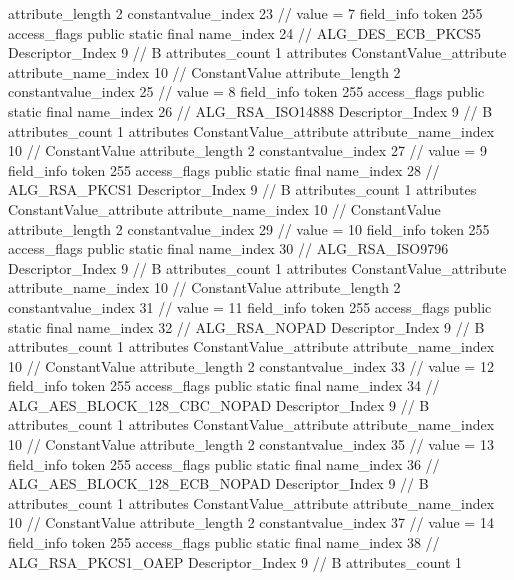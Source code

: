 {{{{{{{					attribute_length	2
					constantvalue_index	23		// value = 7
				}
				}
			}
			field_info {
				token	255
				access_flags	public static final
				name_index	24		// ALG_DES_ECB_PKCS5
				Descriptor_Index	9		// B
				attributes_count	1
				attributes {
				ConstantValue_attribute {
					attribute_name_index	10		// ConstantValue
					attribute_length	2
					constantvalue_index	25		// value = 8
				}
				}
			}
			field_info {
				token	255
				access_flags	public static final
				name_index	26		// ALG_RSA_ISO14888
				Descriptor_Index	9		// B
				attributes_count	1
				attributes {
				ConstantValue_attribute {
					attribute_name_index	10		// ConstantValue
					attribute_length	2
					constantvalue_index	27		// value = 9
				}
				}
			}
			field_info {
				token	255
				access_flags	public static final
				name_index	28		// ALG_RSA_PKCS1
				Descriptor_Index	9		// B
				attributes_count	1
				attributes {
				ConstantValue_attribute {
					attribute_name_index	10		// ConstantValue
					attribute_length	2
					constantvalue_index	29		// value = 10
				}
				}
			}
			field_info {
				token	255
				access_flags	public static final
				name_index	30		// ALG_RSA_ISO9796
				Descriptor_Index	9		// B
				attributes_count	1
				attributes {
				ConstantValue_attribute {
					attribute_name_index	10		// ConstantValue
					attribute_length	2
					constantvalue_index	31		// value = 11
				}
				}
			}
			field_info {
				token	255
				access_flags	public static final
				name_index	32		// ALG_RSA_NOPAD
				Descriptor_Index	9		// B
				attributes_count	1
				attributes {
				ConstantValue_attribute {
					attribute_name_index	10		// ConstantValue
					attribute_length	2
					constantvalue_index	33		// value = 12
				}
				}
			}
			field_info {
				token	255
				access_flags	public static final
				name_index	34		// ALG_AES_BLOCK_128_CBC_NOPAD
				Descriptor_Index	9		// B
				attributes_count	1
				attributes {
				ConstantValue_attribute {
					attribute_name_index	10		// ConstantValue
					attribute_length	2
					constantvalue_index	35		// value = 13
				}
				}
			}
			field_info {
				token	255
				access_flags	public static final
				name_index	36		// ALG_AES_BLOCK_128_ECB_NOPAD
				Descriptor_Index	9		// B
				attributes_count	1
				attributes {
				ConstantValue_attribute {
					attribute_name_index	10		// ConstantValue
					attribute_length	2
					constantvalue_index	37		// value = 14
				}
				}
			}
			field_info {
				token	255
				access_flags	public static final
				name_index	38		// ALG_RSA_PKCS1_OAEP
				Descriptor_Index	9		// B
				attributes_count	1
}}}}}
